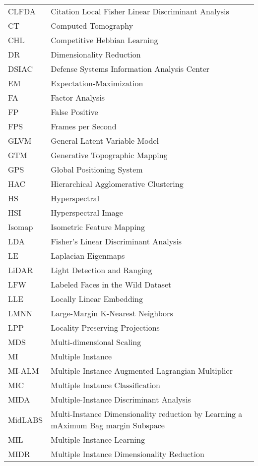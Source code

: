 \begin{tabular}{l p{5in}} %

CLFDA &  Citation Local Fisher Linear Discriminant Analysis\\
CT & Computed Tomography\\
CHL & Competitive Hebbian Learning\\
DR & Dimensionality Reduction\\
DSIAC & Defense Systems Information Analysis Center\\
EM & Expectation-Maximization\\
FA & Factor Analysis\\
FP & False Positive\\ 
FPS & Frames per Second\\
GLVM & General Latent Variable Model\\
GTM & Generative Topographic Mapping\\
GPS & Global Positioning System\\
HAC & Hierarchical Agglomerative Clustering\\
HS & Hyperspectral\\
HSI & Hyperspectral Image\\
Isomap & Isometric Feature Mapping\\
LDA & Fisher's Linear Discriminant Analysis\\
LE & Laplacian Eigenmaps\\
LiDAR & Light Detection and Ranging\\
LFW & Labeled Faces in the Wild Dataset\\
LLE & Locally Linear Embedding\\
LMNN & Large-Margin K-Nearest Neighbors\\
LPP & Locality Preserving Projections\\
MDS & Multi-dimensional Scaling\\
MI & Multiple Instance\\
MI-ALM & Multiple Instance Augmented Lagrangian Multiplier\\
MIC & Multiple Instance Classification\\
MIDA & Multiple-Instance Discriminant Analysis\\
MidLABS & Multi-Instance Dimensionality reduction by Learning a mAximum Bag margin Subspace\\
MIL & Multiple Instance Learning\\
MIDR & Multiple Instance Dimensionality Reduction\\

\end{tabular}
